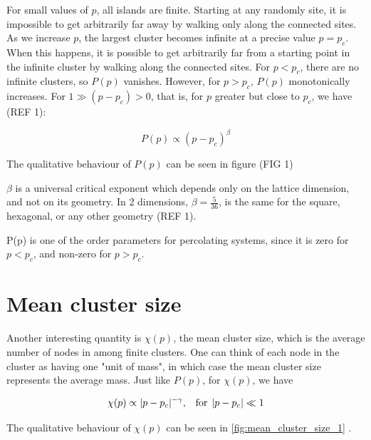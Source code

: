 For small values of $p$, all islands are finite. Starting at any randomly site, it is impossible to get arbitrarily far away by walking only along the connected sites. As we increase $p$, the largest cluster becomes infinite at a precise value $p = p_c$. When this happens, it is possible to get arbitrarily far from a starting point in the infinite cluster by walking along the connected sites. For $p < p_c$, there are no infinite clusters, so $P(p)$ vanishes. However, for $p > p_c$, $P(p)$ monotonically increases. For $1 \gg (p - p_c) > 0$, that is, for $p$ greater  but close to $p_c$, we have (REF 1):

$$
    P(p) \propto (p - p_c)^\beta 
$$

The qualitative behaviour of $P(p)$ can be seen in figure (FIG 1)


$\beta$ is a universal critical exponent which depends only on the lattice dimension, and not on its geometry. In 2 dimensions, $\beta = \frac{5}{36}$, is the same for the square, hexagonal, or any other geometry (REF 1). 

P(p) is one of the order parameters for percolating systems, since it is zero for $p < p_c$, and non-zero for $p > p_c$.


\section{Mean cluster size}
\label{sec:th_mean_cluster_size}

Another interesting quantity is $\chi(p)$, the mean cluster size, which is the average number of nodes in among finite clusters. One can think of each node in the cluster as having one "unit of mass", in which case the mean cluster size represents the average mass. Just like $P(p)$, for $\chi(p)$, we have

$$ 
    \chi(p) \propto  |p - p_c|^{-\gamma} \textrm{,} \hspace{0.35cm}  \textrm{for} \hspace{0.15cm} |p - p_c| \ll 1 
$$ 

The qualitative behaviour of $\chi(p)$ can be seen in \autoref{fig:mean_cluster_size_1}
.


